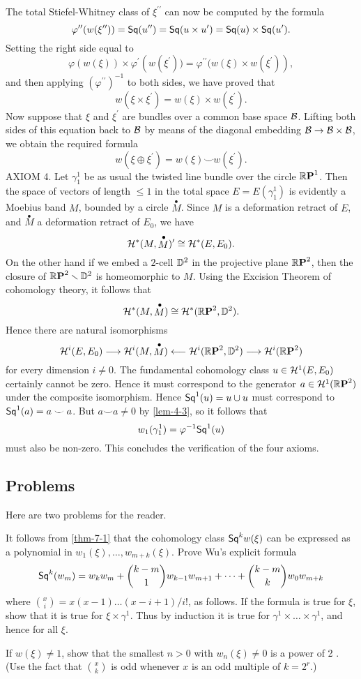 The total Stiefel-Whitney class of $\xi^{\prime \prime}$ can now be computed by the formula
\[
\varphi^{\prime \prime}(w(\xi^{\prime \prime}))=\mathsf{Sq}(u^{\prime \prime})=\mathsf{Sq}(u \times u^{\prime})=\mathsf{Sq}(u) \times \mathsf{Sq}(u^{\prime}).
\]
Setting the right side equal to
\[
\varphi\left(w(\xi)\right) \times \varphi^{\prime}\left(w(\xi^{\prime}))=\varphi^{\prime \prime}(w(\xi) \times w(\xi^{\prime})\right),
\]
and then applying $(\varphi^{\prime \prime})^{-1}$ to both sides, we have proved that
\[
w(\xi \times \xi^{\prime})=w(\xi) \times w(\xi^{\prime}).
\]
Now suppose that $\xi$ and $\xi^{\prime}$ are bundles over a common base space $\mathcal{B} $. Lifting both sides of this equation back to $\mathcal{B} $ by means of the diagonal embedding $\mathcal{B}  \rightarrow \mathcal{B}  \times \mathcal{B} $, we obtain the required formula
\[
w(\xi \oplus \xi^{\prime})=w(\xi) \smile w(\xi^{\prime}).
\]
\noindent\textsf{AXIOM 4.} Let $\gamma_{1}^{1}$ be as usual the twisted line bundle over the circle $\boldsymbol{\mathbb{R}}\boldsymbol{\mathrm{P}}^{1}$. Then the space of vectors of length $\leq 1$ in the total space $E=E(\gamma_{1}^{1})$ is evidently a Moebius band $M$, bounded by a circle $\stackrel{\bullet}{M}$. Since $M$ is a deformation retract of $E$, and $\stackrel{\bullet}{M}$ a deformation retract of $E_{0}$, we have
\[
\mathcal{H}^{*}(M, \stackrel{\bullet}{M})^{\prime} \cong \mathcal{H}^{*}(E, E_{0}).
\]
On the other hand if we embed a $2$-cell $\mathbb{D}^{2}$ in the projective plane $\boldsymbol{\mathbb{R}}\boldsymbol{\mathrm{P}}^{2}$, then the closure of $\boldsymbol{\mathbb{R}}\boldsymbol{\mathrm{P}}^{2}\smallsetminus\mathbb{D}^{2}$ is homeomorphic to $M$. Using the Excision Theorem of cohomology theory, it follows that
\[
\mathcal{H}^{*}(M, \stackrel{\bullet}{M}) \cong \mathcal{H}^{*}(\boldsymbol{\mathbb{R}}\boldsymbol{\mathrm{P}}^{2}, \mathbb{D}^{2}).
\]
Hence there are natural isomorphisms
\[
\mathcal{H}^{i}(E, E_{0}) \longrightarrow \mathcal{H}^{i}(M, \stackrel{\bullet}{M}) \longleftarrow \mathcal{H}^{i}(\boldsymbol{\mathbb{R}}\boldsymbol{\mathrm{P}}^{2}, \mathbb{D}^{2}) \longrightarrow \mathcal{H}^{i}(\boldsymbol{\mathbb{R}}\boldsymbol{\mathrm{P}}^{2})
\]
for every dimension $i \neq 0$. The fundamental cohomology class $u \in \mathcal{H}^{1}(E, E_{0})$ certainly cannot be zero. Hence it must correspond to the generator $a \in \mathcal{H}^{1}(\boldsymbol{\mathbb{R}}\boldsymbol{\mathrm{P}}^{2})$ under the composite isomorphism. Hence $\mathsf{Sq}^{1}(u)=u \cup u$ must correspond to $\mathsf{Sq}^{1}(a)=a \smile a$. But $a \smile a \neq 0$ by \cref{lem-4-3}, so it follows that
\[
w_{1}(\gamma_{1}^{1})=\varphi^{-1} \mathsf{Sq}^{1}(u)
\]
must also be non-zero. This concludes the verification of the four axioms.

\subsection*{Problems}
Here are two problems for the reader.
\begin{problem}\label{prob-8-A}
	It follows from \cref{thm-7-1} that the cohomology class $\mathsf{Sq}^kw(\xi)$ can be expressed as a polynomial in $w_{1}(\xi), \dots, w_{m+k}(\xi)$. Prove Wu's explicit formula
	\[
	\mathsf{Sq}^{k}(w_{m})=w_{k} w_{m}+\binom{k-m}{1} w_{k-1} w_{m+1}+\dots+\binom{k-m}{k}w_{0} w_{m+k}
	\]
	where $\binom{x}{i} =x(x-1) \dots(x-i+1) / i !$, as follows. If the formula is true for $\xi$, show that it is true for $\xi \times \gamma^{1}$. Thus by induction it is true for $\gamma^{1} \times \dots \times \gamma^{1}$, and hence for all $\xi$.
\end{problem}

\begin{problem}\label{prob-8-B}
	If $w(\xi) \neq 1$, show that the smallest $n>0$ with $w_{ n }(\xi) \neq 0$ is a power of 2 . (Use the fact that $\binom{x}{k}$ is odd whenever $x$ is an odd multiple of $k=2^{r}$.)
\end{problem}
